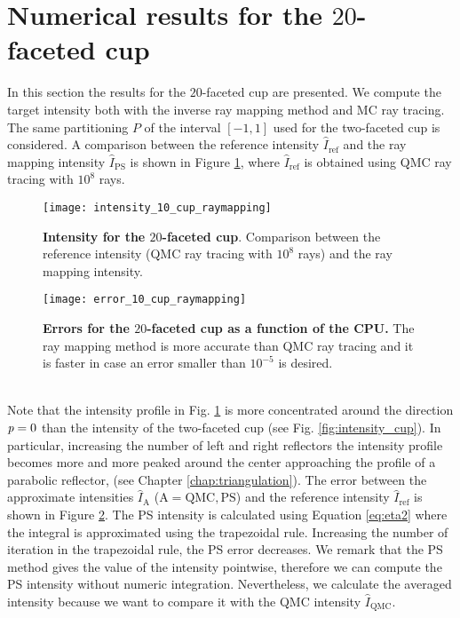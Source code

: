 \section{Numerical results for the $20$-faceted cup}
\label{sec:Numerical results_10cup}
In this section the results for the $20$-faceted cup are presented.
We compute the target intensity both with the inverse ray mapping method and MC ray tracing.
The same partitioning $P$ of the interval $[-1,1]$ used for the two-faceted cup is considered. A comparison between the reference intensity $\hat{I}_{\textrm{ref}}$ and the ray mapping intensity $\hat{I}_{\textrm{PS}}$ is shown in Figure \ref{fig:intensity10cup}, where $\hat{I}_{\textrm{ref}}$ is obtained using QMC ray tracing with $10^8$ rays.
\begin{figure}[h!]
\centering
\texttt{[image: intensity\_10\_cup\_raymapping]}
\caption{\textbf{Intensity for the $20$-faceted cup}.
Comparison between the reference intensity (QMC ray tracing with $10^8$ rays) and the ray mapping intensity.}
\label{fig:intensity10cup}
\end{figure}
\begin{figure}[h!]
\centering
\texttt{[image: error\_10\_cup\_raymapping]}
\caption{\textbf{Errors for the $20$-faceted cup as a function of the CPU.} The ray mapping method is more accurate than QMC ray tracing and it is faster in case an error smaller than $10^{-5}$ is desired.}
\label{fig:error10cup} 
\end{figure}
\\ \indent Note that the intensity profile in Fig. \ref{fig:intensity10cup} is more concentrated around the direction $\textit{p}=0$ than the intensity of the two-faceted cup (see Fig. \ref{fig:intensity_cup}). In particular, increasing the number of left and right reflectors the intensity profile becomes more and more peaked around the center approaching the profile of a parabolic reflector, (see Chapter \ref{chap:triangulation}).
The error between the approximate intensities $\hat{I}_{\textrm{A}}$ ($\textrm{A} = \textrm{QMC}, \textrm{PS}$) and the reference intensity $\hat{I}_{\textrm{ref}}$ is shown in Figure \ref{fig:error10cup}. 
The PS intensity is calculated using Equation \ref{eq:eta2} where the integral is approximated using the trapezoidal rule. Increasing the number of iteration in the trapezoidal rule, the PS error decreases. 
We remark that the PS method gives the value of the intensity pointwise, therefore we can compute the PS intensity without numeric integration. Nevertheless, we calculate the averaged intensity because we want to compare it with the QMC intensity $\hat{I}_{\textrm{QMC}}$.
